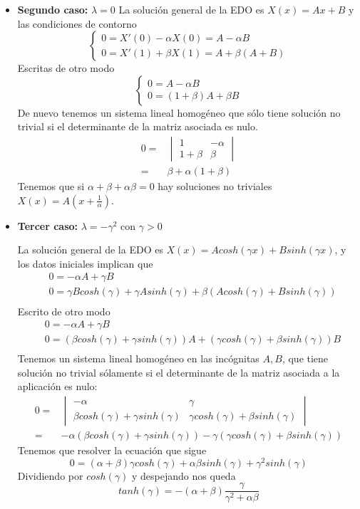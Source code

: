 \begin{itemize}
\item \textbf{Segundo caso:} $\lambda=0$
La solución general de la EDO es $X(x) = Ax+B$ y las condiciones de contorno
\begin{equation*}
\left\{
\begin{array}{l}
0=X'(0) -\alpha X(0)=A-\alpha B\\
0=X'(1)+\beta X(1) = A+\beta(A+B)
\end{array}
\right.
\end{equation*}
Escritas de otro modo
\begin{equation*}
\left\{
\begin{array}{l}
0=A-\alpha B\\
0=(1+\beta)A+\beta B
\end{array}
\right.
\end{equation*}
De nuevo tenemos un sistema lineal homogéneo que sólo tiene solución no trivial si el determinante de la matriz asociada es nulo.
\begin{align*}
0=&\begin{vmatrix}1 & -\alpha \\ 1+\beta & \beta \end{vmatrix}\\
 = & \beta+\alpha(1+\beta)
\end{align*}
Tenemos que si $\alpha+\beta+\alpha\beta = 0$ hay soluciones no triviales $X(x)=A(x+\frac{1}{\alpha})$.
\item \textbf{Tercer caso:} $\lambda=-\gamma^2$ con $\gamma > 0$

La solución general de la EDO es $X(x) = Acosh(\gamma x)+Bsinh(\gamma x)$, y los datos iniciales implican que
\begin{align*}
& 0 = -\alpha A+\gamma B\\
& 0 = \gamma B cosh(\gamma) + \gamma Asinh(\gamma)+\beta (Acosh(\gamma)+Bsinh(\gamma))\\
\end{align*}
Escrito de otro modo
\begin{align*}
& 0 = -\alpha A+\gamma B\\
& 0 = \left(\beta cosh(\gamma)+\gamma sinh(\gamma)\right)A+\left(\gamma cosh(\gamma)+\beta sinh(\gamma)\right)B\\
\end{align*}
Tenemos un sistema lineal homogéneo en las incógnitas $A,B$, que tiene solución no trivial sólamente si el determinante de la matriz asociada a la aplicación es nulo:
\begin{align*}
0=&\begin{vmatrix}-\alpha & \gamma \\ \beta cosh(\gamma)+\gamma sinh(\gamma) & \gamma cosh(\gamma) +\beta sinh(\gamma)\end{vmatrix}\\
 = & -\alpha(\beta cosh(\gamma)+\gamma sinh(\gamma))-\gamma(\gamma cosh(\gamma) +\beta sinh(\gamma))
\end{align*}
Tenemos que resolver la ecuación que sigue
$$0=(\alpha+\beta)\gamma cosh(\gamma) +\alpha\beta sinh(\gamma)+\gamma^2sinh(\gamma)$$
Dividiendo por $cosh(\gamma)$ y despejando nos queda
$$tanh(\gamma) = -(\alpha+\beta)\frac{\gamma}{\gamma^2+\alpha\beta}$$
\end{itemize}